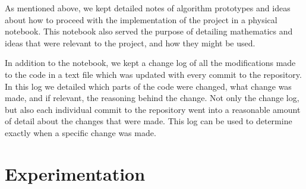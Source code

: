\documentclass[a4paper,11pt]{article}
\begin{document}
   As mentioned above, we kept detailed notes of algorithm prototypes and ideas
   about how to proceed with the implementation of the project in a physical
   notebook. This notebook also served the purpose of detailing mathematics and
   ideas that were relevant to the project, and how they might be used. 

   In addition to the notebook, we kept a change log of all the modifications
   made to the code in a text file which was updated with every commit to the
   repository. In this log we detailed which parts of the code were changed,
   what change was made, and if relevant, the reasoning behind the change. Not
   only the change log, but also each individual commit to the repository went
   into a reasonable amount of detail about the changes that were made. This log
   can be used to determine exactly when a specific change was made.
\section{Experimentation}
\label{sec-8}
\end{document}
